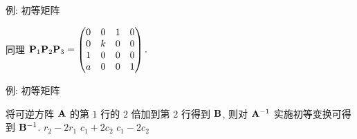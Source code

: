 \begin{frame}{例: 初等矩阵}
	\onslide<+->
	\begin{solutionc}
		同理 ${\mathbf{P}}_1{\mathbf{P}}_2{\mathbf{P}}_3=\begin{pmatrix}
			0&0&1&0\\
			0&k&0&0\\
			1&0&0&0\\
			a&0&0&1
		\end{pmatrix}.$

		\onslide<+->{%
		\[(\bfP_1\bfP_2\bfP_3)^{-1}=\bfP_3^{-1}\bfP_2^{-1}\bfP_1^{-1}=\begin{pmatrix}
			0&0&1&0\\
			0&1/k&0&0\\
			1&0&0&0\\
			0&0&-a&1
		\end{pmatrix}.\]}
		\vspace{-\baselineskip}
	\end{solutionc}
\end{frame}


\begin{frame}{例: 初等矩阵}
	\onslide<+->
	\begin{exercise}
		将可逆方阵 ${\mathbf{A}}$ 的第 $1$ 行的 $2$ 倍加到第 $2$ 行得到 ${\mathbf{B}}$, 则对 ${\mathbf{A}}^{-1}$ 实施初等变换可得到 ${\mathbf{B}}^{-1}$.
		{$r_2-2r_1$}%
		{$c_1+2c_2$}%
		{$c_1-2c_2$}
	\end{exercise}
\end{frame}



